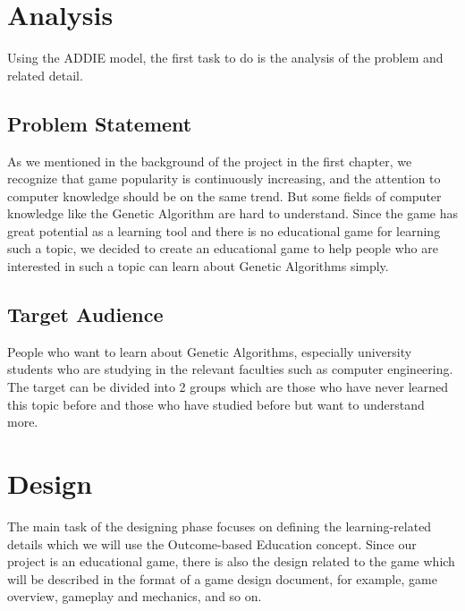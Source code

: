 \documentclass[12pt,oneside,openright,a4paper]{cpe-english-project}
\begin{document}
\section{Analysis}
Using the ADDIE model, the first task to do is the analysis of the problem and related detail.

\subsection{Problem Statement}
As we mentioned in the background of the project in the first chapter, we recognize that game popularity is continuously increasing, and the attention to computer knowledge should be on the same trend. But some fields of computer knowledge like the Genetic Algorithm are hard to understand. Since the game has great potential as a learning tool and there is no educational game for learning such a topic, we decided to create an educational game to help people who are interested in such a topic can learn about Genetic Algorithms simply.

\subsection{Target Audience}
People who want to learn about Genetic Algorithms, especially university students who are studying in the relevant faculties such as computer engineering. The target can be divided into 2 groups which are those who have never learned this topic before and those who have studied before but want to understand more.


\section{Design}
The main task of the designing phase focuses on defining the learning-related details which we will use the Outcome-based Education concept. Since our project is an educational game, there is also the design related to the game which will be described in the format of a game design document, for example, game overview, gameplay and mechanics, and so on.
\end{document}
